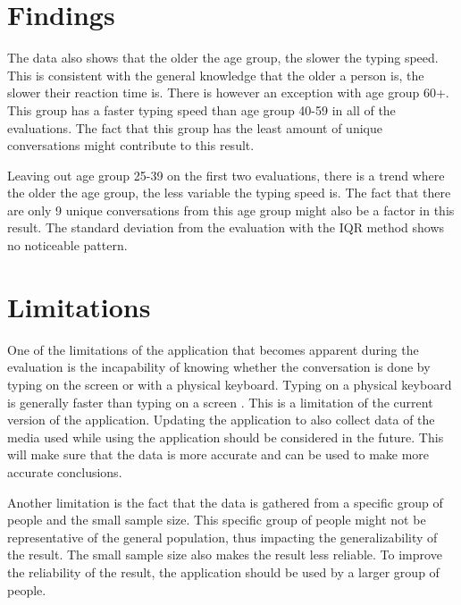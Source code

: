 \section{Findings}


The data also shows that the older the age group, the slower the typing speed.
This is consistent with the general knowledge that the older a person is, the slower their reaction time is.
There is however an exception with age group 60+.
This group has a faster typing speed than age group 40-59 in all of the evaluations.
The fact that this group has the least amount of unique conversations might contribute to this result.

Leaving out age group 25-39 on the first two evaluations, there is a trend where the older the age group, the less variable the typing speed is.
The fact that there are only 9 unique conversations from this age group might also be a factor in this result.
The standard deviation from the evaluation with the \ac{IQR} method shows no noticeable pattern.

\section{Limitations}

One of the limitations of the application that becomes apparent during the evaluation is the incapability of knowing whether the conversation is done by typing on the screen or with a physical keyboard.
Typing on a physical keyboard is generally faster than typing on a screen \cite{Varcholik2012}.
This is a limitation of the current version of the application.
Updating the application to also collect data of the media used while using the application should be considered in the future.
This will make sure that the data is more accurate and can be used to make more accurate conclusions.

Another limitation is the fact that the data is gathered from a specific group of people and the small sample size.
This specific group of people might not be representative of the general population, thus impacting the generalizability of the result.
The small sample size also makes the result less reliable.
To improve the reliability of the result, the application should be used by a larger group of people.

